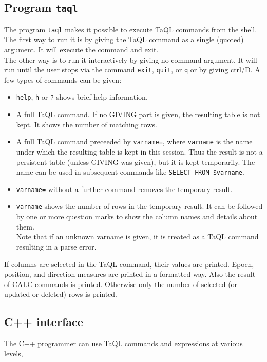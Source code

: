 \subsection{Program \texttt{taql}}
  The program \texttt{taql} makes it possible to execute TaQL commands
  from the shell. 
  \\The first way to run it is by giving the TaQL command as a single
  (quoted) argument. It will execute the command and exit.
  \\The other way is to run it interactively by giving no command
  argument. It will run until the user stops via the
  command \texttt{exit}, \texttt{quit}, or \texttt{q} or by giving
  ctrl/D. A few types of commands can be given:
  \begin{itemize}
    \item \texttt{help}, \texttt{h} or \texttt{?} shows brief help information.
    \item A full TaQL command. If no GIVING part is given, the
      resulting table is not kept. It shows the number of matching rows.
    \item A full TaQL command preceeded by \texttt{varname=}, where
      \texttt{varname} is the name under which the resulting table is
      kept in this session. Thus the result is not a persistent table
      (unless GIVING was given), but it is kept temporarily.
      The name can be used in subsequent commands like
      \texttt{SELECT FROM \$varname}.
    \item \texttt{varname=} without a further command removes the
      temporary result.
    \item \texttt{varname} shows the number of rows in the temporary
      result. It can be followed by one or more question marks to show
      the column names and details about them.
      \\Note that if an unknown varname is given, it is treated as a
      TaQL command resulting in a parse error.
  \end{itemize}
  If columns are selected in the TaQL command, their values are
  printed. Epoch, position, and direction measures are printed in a
  formatted way.  Also the result of
  CALC commands is printed. Otherwise only the number of selected (or
  updated or deleted) rows is printed.

\subsection{C++ interface}
The C++ programmer can use TaQL commands and expressions at various levels,
